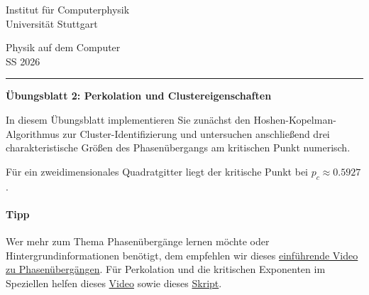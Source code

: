 \documentclass[12pt, a4paper]{article}
\begin{document}
\begin{minipage}[t]{0.55\textwidth}
  Institut für Computerphysik\\
  Universität Stuttgart
\end{minipage}%
\hfill
\begin{minipage}[t]{0.4\textwidth}
  \raggedleft
  Physik auf dem Computer\\
  SS 2026
\end{minipage}

\rule{\textwidth}{0.4pt}

\vspace{0.6em}

{\LARGE\bfseries Übungsblatt 2: Perkolation und Clustereigenschaften}

\vspace{1em}

In diesem Übungsblatt implementieren Sie zunächst den Hoshen-Kopelman-Algorithmus
zur Cluster-Identifizierung und untersuchen anschließend drei charakteristische
Größen des Phasenübergangs am kritischen Punkt numerisch.

Für ein zweidimensionales Quadratgitter liegt der kritische Punkt bei $p_c \approx 0.5927$.

\paragraph{Tipp}
Wer mehr zum Thema Phasenübergänge lernen möchte oder Hintergrundinformationen benötigt,
dem empfehlen wir dieses
\href{https://www.youtube.com/watch?v=itRV2jEtV8Q}{einführende Video zu Phasenübergängen}.
Für Perkolation und die kritischen Exponenten im Speziellen
helfen dieses
\href{https://www.youtube.com/watch?v=a-767WnbaCQ}{Video}
sowie dieses
\href{https://people.physik.hu-berlin.de/~sokolov/STAT18/Percolation.pdf}{Skript}.

\vspace{0.5em}
\end{document}
